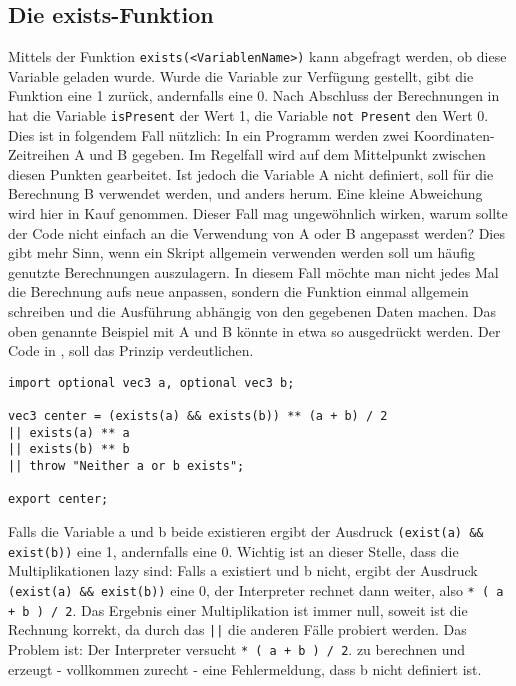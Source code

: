 \subsection{Die exists-Funktion}
Mittels der Funktion \texttt{exists(<VariablenName>)} kann abgefragt werden, ob diese Variable geladen wurde.
Wurde die Variable zur Verfügung gestellt, gibt die Funktion eine 1 zurück, andernfalls eine 0.
Nach Abschluss der Berechnungen in  hat die Variable \texttt{isPresent} der Wert 1, die Variable \texttt{not Present} den Wert 0.
Dies ist in folgendem Fall nützlich:
In ein Programm werden zwei Koordinaten-Zeitreihen A und B gegeben.
Im Regelfall wird auf dem Mittelpunkt zwischen diesen Punkten gearbeitet.
Ist jedoch die Variable A nicht definiert, soll für die Berechnung B verwendet werden, und anders herum.
Eine kleine Abweichung wird hier in Kauf genommen.
Dieser Fall mag ungewöhnlich wirken, warum sollte der Code nicht einfach an die Verwendung von A oder B angepasst werden?
Dies gibt mehr Sinn, wenn ein Skript allgemein verwenden werden soll um häufig genutzte Berechnungen auszulagern.
In diesem Fall möchte man nicht jedes Mal die Berechnung aufs neue anpassen, sondern die Funktion einmal allgemein schreiben und die Ausführung abhängig von den gegebenen Daten machen.
Das oben genannte Beispiel mit A und B könnte in etwa so ausgedrückt werden.
Der Code in , soll das Prinzip verdeutlichen.
\begin{lstlisting}[language=prepro, label={lst:OptionalImportExample}, caption={PrePro-Code mit optionalen Imports}, captionpos=b]
import optional vec3 a, optional vec3 b;

vec3 center = (exists(a) && exists(b)) ** (a + b) / 2
|| exists(a) ** a
|| exists(b) ** b
|| throw "Neither a or b exists";

export center;
\end{lstlisting}
Falls die Variable a und b beide existieren ergibt der Ausdruck \texttt{(exist(a) \&\& exist(b))} eine 1, andernfalls eine 0.
Wichtig ist an dieser Stelle, dass die Multiplikationen lazy sind:
Falls a existiert und b nicht, ergibt der Ausdruck \texttt{(exist(a) \&\& exist(b))} eine 0, der Interpreter rechnet dann weiter, also \texttt{* ( a + b ) / 2}.
Das Ergebnis einer Multiplikation ist immer null, soweit ist die Rechnung korrekt, da durch das \texttt{||} die anderen Fälle probiert werden.
Das Problem ist:
Der Interpreter versucht \texttt{* ( a + b ) / 2}. zu berechnen und erzeugt - vollkommen zurecht - eine Fehlermeldung, dass b nicht definiert ist.\\

